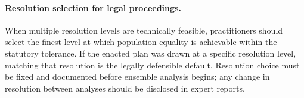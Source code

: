 \paragraph{Resolution selection for legal proceedings.}
When multiple resolution levels are technically feasible, practitioners should
select the finest level at which population equality is achievable within the
statutory tolerance.
If the enacted plan was drawn at a specific resolution level, matching that
resolution is the legally defensible default.
Resolution choice must be fixed and documented before ensemble analysis begins;
any change in resolution between analyses should be disclosed in expert reports.
